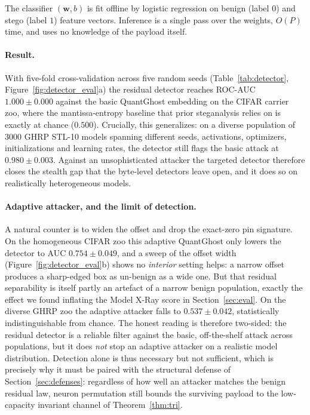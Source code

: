 \documentclass[10pt,journal]{IEEEtran}
\theoremstyle{remark}
\newcommand{\sys}{\mbox{QuantGhost}}
\begin{document}
The classifier $(\mathbf{w},b)$ is fit offline by logistic regression on benign (label $0$)
and stego (label $1$) feature vectors. Inference is a single pass over the weights, $O(P)$
time, and uses no knowledge of the payload itself.

\paragraph{Result.} With five-fold cross-validation across five random seeds
(Table~\ref{tab:detector}, Figure~\ref{fig:detector_eval}a) the residual detector reaches
ROC-AUC $1.000\pm0.000$ against the basic \sys{} embedding on the CIFAR carrier zoo, where
the mantissa-entropy baseline that prior steganalysis relies on is exactly at chance
($0.500$). Crucially, this generalizes: on a diverse population of $3000$ GHRP STL-10
models spanning different seeds, activations, optimizers, initializations and learning
rates, the detector still flags the basic attack at $0.980\pm0.003$. Against an
unsophisticated attacker the targeted detector therefore closes the stealth gap that the
byte-level detectors leave open, and it does so on realistically heterogeneous models.

\paragraph{Adaptive attacker, and the limit of detection.} A natural counter is to widen
the offset and drop the exact-zero pin signature. On the homogeneous CIFAR zoo this
adaptive \sys{} only lowers the detector to AUC $0.754\pm0.049$, and a sweep of the offset
width (Figure~\ref{fig:detector_eval}b) shows no \emph{interior} setting helps: a narrow
offset produces a sharp-edged box as un-benign as a wide one. But that residual
separability is itself partly an artefact of a narrow benign population, exactly the effect
we found inflating the Model X-Ray score in Section~\ref{sec:eval}. On the diverse GHRP
zoo the adaptive attacker falls to $0.537\pm0.042$, statistically indistinguishable from
chance. The honest reading is therefore two-sided: the residual detector is a reliable
filter against the basic, off-the-shelf attack across populations, but it does \emph{not}
stop an adaptive attacker on a realistic model distribution. Detection alone is thus
necessary but not sufficient, which is precisely why it must be paired with the structural
defense of Section~\ref{sec:defenses}: regardless of how well an attacker matches the
benign residual law, neuron permutation still bounds the surviving payload to the
low-capacity invariant channel of Theorem~\ref{thm:tri}.
\end{document}
